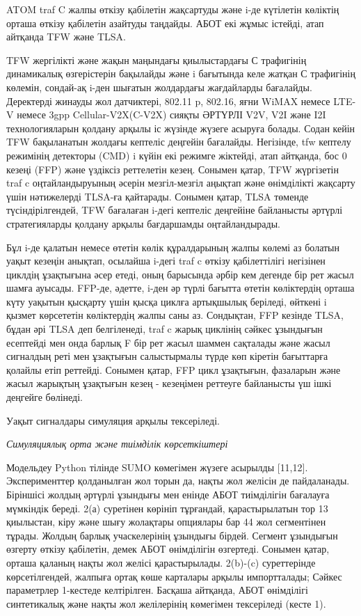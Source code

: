 \begin{multicols}{2}

ATOM traf C жалпы өткізу қабілетін жақсартуды және i-де күтілетін
көліктің орташа өткізу қабілетін азайтуды таңдайды. АБОТ екі жұмыс
істейді, атап айтқанда TFW және TLSA.

TFW жергілікті және жақын маңындағы қиылыстардағы С трафигінің
динамикалық өзгерістерін бақылайды және i бағытында келе жатқан С
трафигінің көлемін, сондай-ақ i-ден шығатын жолдардағы жағдайларды
бағалайды. Деректерді жинауды жол датчиктері, 802.11 p, 802.16, яғни
WiMAX немесе LTE-V немесе 3gpp Cellular-V2X(C-V2X) сияқты ӘРТҮРЛІ V2V,
V2I және I2I технологияларын қолдану арқылы іс жүзінде жүзеге асыруға
болады. Содан кейін TFW бақыланатын жолдағы кептеліс деңгейін бағалайды.
Негізінде, tfw кептелу режимінің детекторы (CMD) i күйін екі режимге
жіктейді, атап айтқанда, бос 0 кезеңі (FFP) және үздіксіз реттелетін
кезең. Сонымен қатар, TFW жүргізетін traf c оңтайландыруының әсерін
мезгіл-мезгіл аңықтап және өнімділікті жақсарту үшін нәтижелерді TLSA-ға
қайтарады. Сонымен қатар, TLSA төменде түсіндірілгендей, TFW бағалаған
i-дегі кептеліс деңгейіне байланысты әртүрлі стратегияларды қолдану
арқылы бағдаршамды оңтайландырады.

Бұл i-де қалатын немесе өтетін көлік құралдарының жалпы көлемі аз
болатын уақыт кезеңін анықтап, осылайша i-дегі traf c өткізу
қабілеттілігі негізінен циклдің ұзақтығына әсер етеді, оның барысында
әрбір кем дегенде бір рет жасыл шамға ауысады. FFP-де, әдетте, i-ден әр
түрлі бағытта өтетін көліктердің орташа күту уақытын қысқарту үшін қысқа
циклға артықшылық беріледі, өйткені i қызмет көрсететін көліктердің
жалпы саны аз. Сондықтан, FFP кезінде TLSA, бұдан әрі TLSA деп
белгіленеді, traf c жарық циклінің сәйкес ұзындығын есептейді мен онда
барлық F бір рет жасыл шаммен сақталады және жасыл сигналдың реті мен
ұзақтығын салыстырмалы түрде көп кіретін бағыттарға қолайлы етіп
реттейді. Сонымен қатар, FFP цикл ұзақтығын, фазаларын және жасыл
жарықтың ұзақтығын кезең - кезеңімен реттеуге байланысты үш ішкі
деңгейге бөлінеді.

Уақыт сигналдары симуляция арқылы тексеріледі.

\emph{Симуляциялық орта және тиімділік көрсеткіштері}

Модельдеу Python тілінде SUMO көмегімен жүзеге асырылды {[}11,12{]}.
Эксперименттер қолданылған жол торын да, нақты жол желісін де
пайдаланады. Біріншісі жолдың әртүрлі ұзындығы мен енінде АБОТ
тиімділігін бағалауға мүмкіндік береді. 2(а) суретінен көрініп
тұрғандай, қарастырылатын тор 13 қиылыстан, кіру және шығу жолақтары
опциялары бар 44 жол сегментінен тұрады. Жолдың барлық учаскелерінің
ұзындығы бірдей. Сегмент ұзындығын өзгерту өткізу қабілетін, демек АБОТ
өнімділігін өзгертеді. Сонымен қатар, орташа қаланың нақты жол желісі
қарастырылады. 2(b)-(c) суреттерінде көрсетілгендей, жалпыға ортақ көше
карталары арқылы импортталады; Сәйкес параметрлер 1-кестеде келтірілген.
Басқаша айтқанда, АБОТ өнімділігі синтетикалық және нақты жол
желілерінің көмегімен тексеріледі (кесте 1).
\end{multicols}

